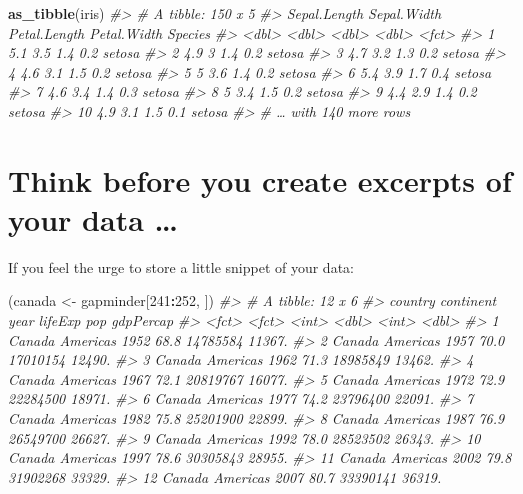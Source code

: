 \documentclass[
]{book}
\newenvironment{Shaded}{\begin{snugshade}}{\end{snugshade}}
\newcommand{\CommentTok}[1]{\textcolor[rgb]{0.56,0.35,0.01}{\textit{#1}}}
\newcommand{\DecValTok}[1]{\textcolor[rgb]{0.00,0.00,0.81}{#1}}
\newcommand{\KeywordTok}[1]{\textcolor[rgb]{0.13,0.29,0.53}{\textbf{#1}}}
\newcommand{\NormalTok}[1]{#1}
\newcommand{\OperatorTok}[1]{\textcolor[rgb]{0.81,0.36,0.00}{\textbf{#1}}}
\newcommand{\StringTok}[1]{\textcolor[rgb]{0.31,0.60,0.02}{#1}}
\begin{document}
\begin{Shaded}
\begin{Highlighting}[]
\KeywordTok{as_tibble}\NormalTok{(iris)}
\CommentTok{#> # A tibble: 150 x 5}
\CommentTok{#>    Sepal.Length Sepal.Width Petal.Length Petal.Width Species}
\CommentTok{#>           <dbl>       <dbl>        <dbl>       <dbl> <fct>  }
\CommentTok{#>  1          5.1         3.5          1.4         0.2 setosa }
\CommentTok{#>  2          4.9         3            1.4         0.2 setosa }
\CommentTok{#>  3          4.7         3.2          1.3         0.2 setosa }
\CommentTok{#>  4          4.6         3.1          1.5         0.2 setosa }
\CommentTok{#>  5          5           3.6          1.4         0.2 setosa }
\CommentTok{#>  6          5.4         3.9          1.7         0.4 setosa }
\CommentTok{#>  7          4.6         3.4          1.4         0.3 setosa }
\CommentTok{#>  8          5           3.4          1.5         0.2 setosa }
\CommentTok{#>  9          4.4         2.9          1.4         0.2 setosa }
\CommentTok{#> 10          4.9         3.1          1.5         0.1 setosa }
\CommentTok{#> # … with 140 more rows}
\end{Highlighting}
\end{Shaded}

\hypertarget{think-before-you-create-excerpts-of-your-data}{%
\section{Think before you create excerpts of your data \ldots{}}\label{think-before-you-create-excerpts-of-your-data}}

If you feel the urge to store a little snippet of your data:

\begin{Shaded}
\begin{Highlighting}[]
\NormalTok{(canada <-}\StringTok{ }\NormalTok{gapminder[}\DecValTok{241}\OperatorTok{:}\DecValTok{252}\NormalTok{, ])}
\CommentTok{#> # A tibble: 12 x 6}
\CommentTok{#>    country continent  year lifeExp      pop gdpPercap}
\CommentTok{#>    <fct>   <fct>     <int>   <dbl>    <int>     <dbl>}
\CommentTok{#>  1 Canada  Americas   1952    68.8 14785584    11367.}
\CommentTok{#>  2 Canada  Americas   1957    70.0 17010154    12490.}
\CommentTok{#>  3 Canada  Americas   1962    71.3 18985849    13462.}
\CommentTok{#>  4 Canada  Americas   1967    72.1 20819767    16077.}
\CommentTok{#>  5 Canada  Americas   1972    72.9 22284500    18971.}
\CommentTok{#>  6 Canada  Americas   1977    74.2 23796400    22091.}
\CommentTok{#>  7 Canada  Americas   1982    75.8 25201900    22899.}
\CommentTok{#>  8 Canada  Americas   1987    76.9 26549700    26627.}
\CommentTok{#>  9 Canada  Americas   1992    78.0 28523502    26343.}
\CommentTok{#> 10 Canada  Americas   1997    78.6 30305843    28955.}
\CommentTok{#> 11 Canada  Americas   2002    79.8 31902268    33329.}
\CommentTok{#> 12 Canada  Americas   2007    80.7 33390141    36319.}
\end{Highlighting}
\end{Shaded}
\end{document}
